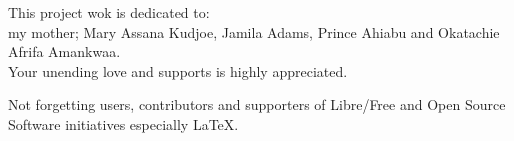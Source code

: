 
\begin{dedication} %
{}
\centering
This project wok is dedicated to:\\
 my mother; Mary Assana Kudjoe, Jamila Adams, Prince Ahiabu and Okatachie Afrifa Amankwaa.\\
Your unending love and supports is highly appreciated.

Not forgetting users, contributors and supporters of Libre/Free and Open Source Software initiatives especially \LaTeX.

\end{dedication}

